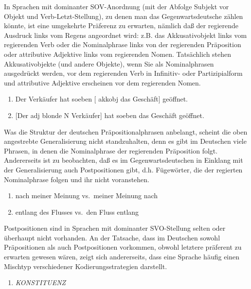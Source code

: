 \documentclass[
]{article}
\providecommand{\tightlist}{%
  \setlength{\itemsep}{0pt}\setlength{\parskip}{0pt}}
\begin{document}
In Sprachen mit dominanter SOV-Anordnung (mit der Abfolge Subjekt vor Objekt und Verb-Letzt-Stellung), zu denen man das Gegenwartsdeutsche zählen könnte, ist eine umgekehrte Präferenz zu erwarten, nämlich daß der regierende Ausdruck links vom Regens angeordnet wird: z.B. das Akkusativobjekt links vom regierenden Verb oder die Nominalphrase links von der regierenden Präposition oder attributive Adjektive links vom regierenden Nomen. Tatsächlich stehen Akkusativobjekte (und andere Objekte), wenn Sie als Nominalphrasen ausgedrückt werden, vor dem regierenden Verb in Infinitiv- oder Partizipialform und attributive Adjektive erscheinen vor dem regierenden Nomen.

\begin{enumerate}
\def\labelenumi{(\arabic{enumi})}
\setcounter{enumi}{21}
\tightlist
\item
  Der Verkäufer hat soeben {[} akkobj das Geschäft{]} geöffnet.
\item
  {[}Der adj blonde N Verkäufer{]} hat soeben das Geschäft geöffnet.
\end{enumerate}

Was die Struktur der deutschen Präpositionalphrasen anbelangt, scheint die oben angestrebte Generalisierung nicht standzuhalten, denn es gibt im Deutschen viele Phrasen, in denen die Nominalphrase der regierenden Präposition folgt. Andererseits ist zu beobachten, daß es im Gegenwartsdeutschen in Einklang mit der Generalisierung auch Postpositionen gibt, d.h. Fügewörter, die der regierten Nominalphrase folgen und ihr nicht voranstehen.

\begin{enumerate}
\def\labelenumi{(\arabic{enumi})}
\setcounter{enumi}{23}
\tightlist
\item
  nach meiner Meinung vs.~meiner Meinung nach
\item
  entlang des Flusses vs.~den Fluss entlang
\end{enumerate}

Postpositionen sind in Sprachen mit dominanter SVO-Stellung selten oder überhaupt nicht vorhanden. An der Tatsache, dass im Deutschen sowohl Präpositionen als auch Postpositionen vorkommen, obwohl letztere präferent zu erwarten gewesen wären, zeigt sich andererseits, dass eine Sprache häufig einen Mischtyp verschiedener Kodierungsstrategien darstellt.

\begin{enumerate}
\def\labelenumi{\arabic{enumi}.}
\setcounter{enumi}{2}
\tightlist
\item
  \emph{KONSTITUENZ}
\end{enumerate}
\end{document}
